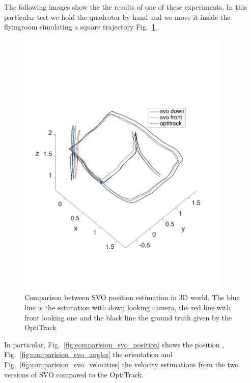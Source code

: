 The following images show the the results of one of these experiments. In this particular test we hold the quadrotor by hand and we move it inside the flyingroom simulating a square trajectory Fig.~\ref{fig:comparision_svo_trajectory}.

\begin{figure}[!htbp]
    \centering
    \includegraphics[width=0.9\textwidth]{img/comparision_between_two_svo_and_opti_trajectory.pdf}
    \caption{Comparison between SVO position estimation in 3D world. The blue line is the estimation with down looking camera, the red line with front looking one and the black line the ground truth given by the OptiTrack}
    \label{fig:comparision_svo_trajectory}
\end{figure}

In particular, Fig.~\ref{fig:comparision_svo_position} shows the position , Fig.~\ref{fig:comparision_svo_angles} the orientation and Fig.~\ref{fig:comparision_svo_velocities} the velocity estimations from the two versions of SVO compared to the OptiTrack.
 
